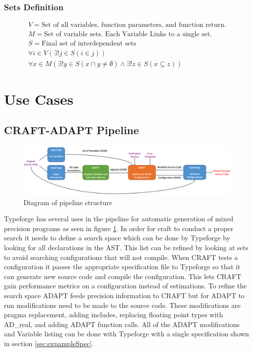 \documentclass[natbib]{article}
\begin{document}
\subsubsection{Sets Definition} \label{sec:setDef}
\begin{gather} 
V = \text{Set of all variables, function parameters, and function return.}\\
M = \text{Set of variable sets. Each Variable Links to a single set.}\\
S = \text{Final set of interdependent sets}\\
\forall i \in V(\exists! j \in S(i \in j))\\
\forall x \in M(\exists! y \in S(x \cap y \neq \emptyset) \wedge 
\exists! z \in S(x \subseteq z))
\end{gather}
\section{Use Cases}
\subsection{CRAFT-ADAPT Pipeline}\label{sec:pipeline}
\begin{figure}[h]
    \centering
    \includegraphics[width=\textwidth]{pipeline.png}
    \caption{\textsf{Diagram of pipeline structure}}
    \label{fig:pipeline}
\end{figure}
\noindent
Typeforge has several uses in the pipeline for automatic generation of mixed precision programs as 
seen in figure \ref{fig:pipeline}. In order for craft to conduct a proper search it needs to define 
a search space which can be done by Typeforge by looking for all declarations in the AST. This 
list can be refined by looking at sets to avoid searching configurations that will not compile. 
When CRAFT tests a configuration it passes the appropriate specification file to Typeforge so 
that it can generate new source code and compile the configuration. This lets CRAFT gain 
performance metrics on a configuration instead of estimations. To refine the search space ADAPT 
feeds precision information to CRAFT but for ADAPT to run modifications need to be made to the 
source code. These modifications are pragma replacement, adding includes, replacing floating point 
types with AD\_real, and adding ADAPT function calls. All of the ADAPT modifications and Variable 
listing can be done with Typeforge with a single specification shown in section \ref{sec:expampleSpec}.


\end{document}
